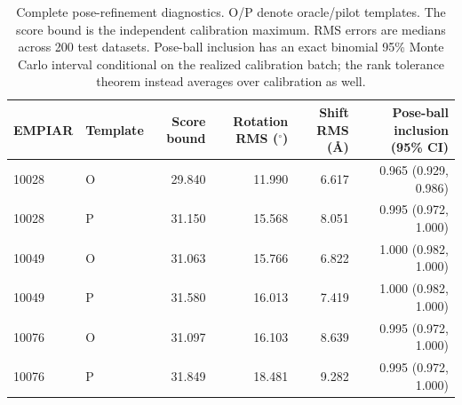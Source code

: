 \begin{table}[t]
\centering\footnotesize
\caption{Complete pose-refinement diagnostics. O/P denote oracle/pilot templates. The score bound is the independent calibration maximum. RMS errors are medians across 200 test datasets. Pose-ball inclusion has an exact binomial 95\% Monte Carlo interval conditional on the realized calibration batch; the rank tolerance theorem instead averages over calibration as well.}
\begin{tabular}{llrrrr}
\toprule
EMPIAR & Template & Score bound & Rotation RMS ($^\circ$) & Shift RMS (\AA) & Pose-ball inclusion (95\% CI) \\
\midrule
10028 & O & 29.840 & 11.990 & 6.617 & 0.965 (0.929, 0.986) \\
10028 & P & 31.150 & 15.568 & 8.051 & 0.995 (0.972, 1.000) \\
10049 & O & 31.063 & 15.766 & 6.822 & 1.000 (0.982, 1.000) \\
10049 & P & 31.580 & 16.013 & 7.419 & 1.000 (0.982, 1.000) \\
10076 & O & 31.097 & 16.103 & 8.639 & 0.995 (0.972, 1.000) \\
10076 & P & 31.849 & 18.481 & 9.282 & 0.995 (0.972, 1.000) \\
\bottomrule
\end{tabular}
\end{table}

